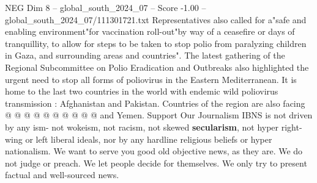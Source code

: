 \begin{textsample}{NEG Dim 8 – global\_south\_2024\_07 – Score -1.00 – global\_south\_2024\_07/111301721.txt}
Representatives also called for a"safe and enabling environment"for vaccination roll-out"by way of a ceasefire or days of tranquillity, to allow for steps to be taken to stop polio from paralyzing children in Gaza, and surrounding areas and countries".
The latest gathering of the Regional Subcommittee on Polio Eradication and Outbreaks also highlighted the urgent need to stop all forms of poliovirus in the Eastern Mediterranean.
It is home to the last two countries in the world with endemic wild poliovirus transmission : Afghanistan and Pakistan.
Countries of the region are also facing @ @ @ @ @ @ @ @ @ @ and Yemen.
Support Our Journalism IBNS is not driven by any ism- not wokeism, not racism, not skewed \textbf{secularism}, not hyper right-wing or left liberal ideals, nor by any hardline religious beliefs or hyper nationalism.
We want to serve you good old objective news, as they are.
We do not judge or preach.
We let people decide for themselves.
We only try to present factual and well-sourced news.

\end{textsample}
